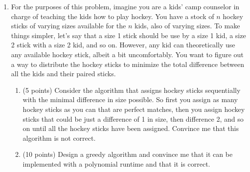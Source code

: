 \documentclass[12pt,letterpaper]{article}
\begin{document}
\begin{enumerate}
    \item For the purposes of this problem, imagine you are a kids' camp counselor in charge of teaching the kids how to play hockey. You have a stock of $n$ hockey sticks of varying sizes available for the $n$ kids, also of varying sizes. To make things simpler, let's say that a size 1 stick should be use by a size 1 kid, a size 2 stick with a size 2 kid, and so on. However, any kid can theoretically use any available hockey stick, albeit a bit uncomfortably. You want to figure out a way to distribute the hockey sticks to minimize the total difference between all the kids and their paired sticks. 
    \begin{enumerate}
        \item (5 points) Consider the algorithm that assigns hockey sticks sequentially with the minimal difference in size possible. So first you assign as many hockey sticks as you can that are perfect matches, then you assign hockey sticks that could be just a difference of 1 in size, then difference 2, and so on until all the hockey sticks have been assigned. Convince me that this algorithm is not correct. 
        \item (10 points) Design a greedy algorithm and convince me that it can be implemented with a polynomial runtime and that it is correct.
    \end{enumerate}
\end{enumerate}
\end{document}
